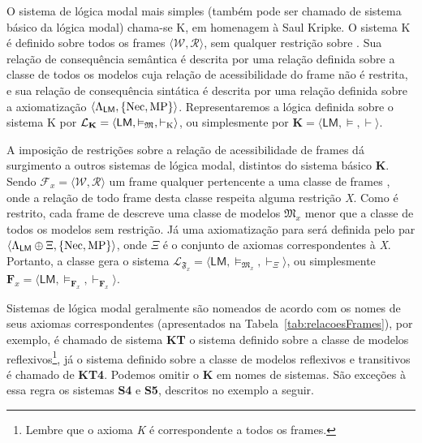         O sistema de lógica modal mais simples (também pode ser chamado de sistema básico da lógica modal) chama-se K, em homenagem à Saul Kripke.
        O sistema K é definido sobre todos os frames \(\langle \mathcal{W}, \mathcal{R} \rangle\), sem qualquer restrição sobre .
        Sua relação de consequência semântica é descrita por uma relação \VDDASH definida sobre a classe
         de todos os modelos cuja relação de acessibilidade do frame não é restrita, e sua relação de
        consequência sintática é descrita por uma relação \VDASH definida sobre a axiomatização \(\langle\Lambda_{\mathsf{LM}}, \{\operatorname{Nec}, \operatorname{MP}\}\rangle\).
        Representaremos a lógica definida sobre o sistema K por \(\mathcal{L}_{\textbf{K}} = \langle \mathsf{LM}, \vDash_{\mathfrak{M}}, \vdash_{\textnormal{K}} \rangle \),
        ou simplesmente por \(\textbf{K} = \langle \mathsf{LM}, \vDash, \vdash \rangle\).

        A imposição de restrições sobre a relação de acessibilidade de frames dá surgimento a outros sistemas de lógica modal, distintos
        do sistema básico \textbf{K}. Sendo \(\mathcal{F}_x = \langle \mathcal{W}, \mathcal{R} \rangle\) um frame qualquer pertencente a uma classe de frames ,
        onde a relação  de todo frame desta classe respeita alguma restrição \textit{X}. Como  é restrito, cada frame  de 
        descreve uma classe de modelos \(\mathfrak{M}_x\) menor que a classe de todos os modelos sem restrição.
        Já uma axiomatização para  será definida pelo par \(\langle\Lambda_{\mathsf{LM}} \mathbin{\oplus} \Xi, \{\operatorname{Nec}, \operatorname{MP}\}\rangle\),
        onde \(\Xi\) é o conjunto de axiomas correspondentes à \textit{X}. Portanto, a classe  gera o sistema
        \(\mathcal{L}_{\mathfrak{F}_x} = \langle \mathsf{LM}, \vDash_{\mathfrak{M}_x}, \vdash_\Xi \rangle\), ou simplesmente
        \({\mathbf{F}_x = \langle \mathsf{LM}, \vDash_{\mathbf{F}_x}, \vdash_{\mathbf{F}_x} \rangle}\).

        Sistemas de lógica modal geralmente são nomeados de acordo com os nomes de seus axiomas correspondentes (apresentados na Tabela~\ref{tab:relacoesFrames}), por
        exemplo, é chamado de sistema \textbf{KT} o sistema definido sobre a classe de modelos reflexivos\footnote{Lembre que o axioma \textit{K} é correspondente
        a todos os frames.}, já o sistema definido sobre a classe de modelos reflexivos e transitivos é chamado de \textbf{KT4}. Podemos omitir o \textbf{K} em nomes
        de sistemas. São exceções à essa regra os sistemas \textbf{S4} e \textbf{S5}, descritos no exemplo a seguir.

